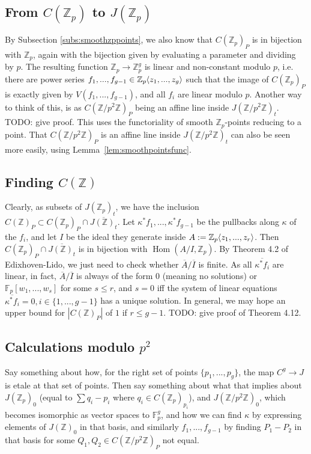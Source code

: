 \documentclass{article}
\newcommand{\Z}{\mathbb{Z}}
\newcommand{\F}{\mathbb{F}}
\renewcommand{\angle}[1]{\hspace{-2pt}\left\langle #1 \right\rangle}
\DeclareMathOperator{\Hom}{Hom}
\theoremstyle{plain}
\theoremstyle{definition}
\theoremstyle{remark}
\begin{document}
\subsection{From \texorpdfstring{$C(\Z_p)$}{C(Z\_p)} to \texorpdfstring{$J(\Z_p)$}{J(Z\_p)}}
By Subsection \ref{subs:smoothzppoints}, we also know that $C(\Z_p)_P$ is in bijection with $\Z_p$, again with the bijection given by evaluating a parameter and dividing by $p$. The resulting function $\Z_p \to \Z_p^g$ is linear and non-constant modulo $p$, i.e. there are power series $f_1,...,f_{g-1} \in \Z_p\angle{z_1,...,z_g}$ such that the image of $C(\Z_p)_P$ is exactly given by $V(f_1,...,f_{g-1})$, and all $f_i$ are linear modulo $p$. Another way to think of this, is as $C(\Z/p^2\Z)_P$ being an affine line inside $J(\Z/p^2\Z)_t$.
TODO: give proof. This uses the functoriality of smooth $\Z_p$-points reducing to a point. That $C(\Z/p^2\Z)_P$ is an affine line inside $J(\Z/p^2\Z)_t$ can also be seen more easily, using Lemma~\ref{lem:smoothpointsfunc}. 

\subsection{Finding \texorpdfstring{$C(\Z)$}{C(Z)}}
Clearly, as subsets of $J(\Z_p)_t$, we have the inclusion $C(\Z)_P \subset C(\Z_p)_P \cap \overline{J(\Z)_t}$. Let $\kappa^*f_1,...,\kappa^*f_{g-1}$ be the pullbacks along $\kappa$ of the $f_i$, and let $I$ be the ideal they generate inside $A := \Z_p\angle{z_1,...,z_r}$. Then $C(\Z_p)_P \cap \overline{J(\Z)_t}$ is in bijection with $\Hom(A/I,\Z_p)$. By Theorem 4.2 of Edixhoven-Lido, we just need to check whether $\overline{A}/\overline{I}$ is finite. As all $\overline{\kappa^* f_i}$ are linear, in fact, $\overline{A}/\overline{I}$ is always of the form $0$ (meaning no solutions) or $\F_p[w_1,...,w_s]$ for some $s \leq r$, and $s = 0$ iff the system of linear equations $\overline{\kappa^* f_i} = 0, i \in \{1,...,g-1\}$ has a unique solution. In general, we may hope an upper bound for $|C(\Z)_P|$ of $1$ if $r \leq g-1$.
TODO: give proof of Theorem 4.12.

\subsection{Calculations modulo \texorpdfstring{$p^2$}{p\^2}}
Say something about how, for the right set of points $\{p_1,...,p_g\}$, the map $C^{g} \to J$ is etale at that set of points. Then say something about what that implies about $J(\Z_p)_0$ (equal to $\sum q_i - p_i$ where $q_i \in C(\Z_p)_{p_i}$), and $J(\Z/p^2\Z)_0$, which becomes isomorphic as vector spaces to $\F_p^g$, and how we can find $\kappa$ by expressing elements of $J(\Z)_0$ in that basis, and similarly $f_1,...,f_{g-1}$ by finding $P_1 - P_2$ in that basis for some $Q_1,Q_2 \in C(\Z/p^2\Z)_P$ not equal.
\end{document}
